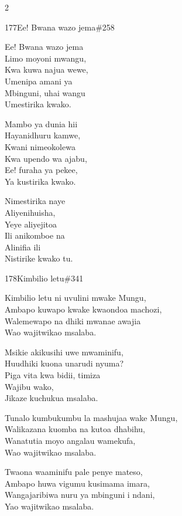 \documentclass{article}
\begin{document}
\begin{multicols}{2}
\begin{hymn}{177}{Ee! Bwana wazo jema}{\#258}
\begin{stanza}
Ee! Bwana wazo jema\\
Limo moyoni mwangu,\\
Kwa kuwa najua wewe,\\
Umenipa amani ya\\
Mbinguni, uhai wangu\\
Umestirika kwako.
\end{stanza}
\begin{stanza}
Mambo ya dunia hii\\
Hayanidhuru kamwe,\\
Kwani nimeokolewa\\
Kwa upendo wa ajabu,\\
Ee! furaha ya pekee,\\
Ya kustirika kwako.
\end{stanza}
\begin{stanza}
Nimestirika naye\\
Aliyenihuisha,\\
Yeye aliyejitoa\\
Ili anikomboe na\\
Alinifia ili\\
Nistirike kwako tu.
\end{stanza}
\end{hymn}

\begin{hymn}{178}{Kimbilio letu}{\#341}
\begin{stanza}
Kimbilio letu ni uvulini mwake Mungu,\\
Ambapo kuwapo kwake kwaondoa machozi,\\
Walemewapo na dhiki mwanae awajia\\
Wao wajitwikao msalaba.
\end{stanza}
\begin{chorus}
Msikie akikusihi uwe mwaminifu,\\
Huudhiki kuona unarudi nyuma?\\
Piga vita kwa bidii, timiza\\
Wajibu wako,\\
Jikaze kuchukua msalaba.
\end{chorus}
\begin{stanza}
Tunalo kumbukumbu la mashujaa wake Mungu,\\
Walikazana kuomba na kutoa dhabihu,\\
Wanatutia moyo angalau wamekufa,\\
Wao wajitwikao msalaba.
\end{stanza}
\begin{stanza}
Twaona waaminifu pale penye mateso,\\
Ambapo huwa vigumu kusimama imara,\\
Wangajaribiwa nuru ya mbinguni i ndani,\\
Yao wajitwikao msalaba.
\end{stanza}
\end{hymn}


\end{multicols}
\end{document}
